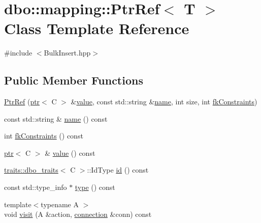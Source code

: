 \hypertarget{classdbo_1_1mapping_1_1_ptr_ref}{\section{dbo\+:\+:mapping\+:\+:Ptr\+Ref$<$ T $>$ Class Template Reference}
\label{classdbo_1_1mapping_1_1_ptr_ref}
}


{\ttfamily \#include $<$Bulk\+Insert.\+hpp$>$}

\subsection*{Public Member Functions}
\begin{DoxyCompactItemize}
\item 
\hyperlink{classdbo_1_1mapping_1_1_ptr_ref_a4db1b98f81576daa11f9f1bea49b35bb}{Ptr\+Ref} (\hyperlink{classdbo_1_1ptr}{ptr}$<$ C $>$ \&\hyperlink{classdbo_1_1mapping_1_1_ptr_ref_aa8e1c4fddbf00c5500980afb1f55ade8}{value}, const std\+::string \&\hyperlink{classdbo_1_1mapping_1_1_ptr_ref_a69221246e46fc6a9acb768fe4481cdf3}{name}, int size, int \hyperlink{classdbo_1_1mapping_1_1_ptr_ref_acff9c1f76ec5eca8c092d021bf59b0b0}{fk\+Constraints})
\item 
const std\+::string \& \hyperlink{classdbo_1_1mapping_1_1_ptr_ref_a69221246e46fc6a9acb768fe4481cdf3}{name} () const 
\item 
int \hyperlink{classdbo_1_1mapping_1_1_ptr_ref_acff9c1f76ec5eca8c092d021bf59b0b0}{fk\+Constraints} () const 
\item 
\hyperlink{classdbo_1_1ptr}{ptr}$<$ C $>$ \& \hyperlink{classdbo_1_1mapping_1_1_ptr_ref_aa8e1c4fddbf00c5500980afb1f55ade8}{value} () const 
\item 
\hyperlink{structdbo_1_1traits_1_1dbo__traits}{traits\+::dbo\+\_\+traits}$<$ C $>$\+::Id\+Type \hyperlink{classdbo_1_1mapping_1_1_ptr_ref_af8368c09d2719cda38a089e9ae5f77d8}{id} () const 
\item 
const std\+::type\+\_\+info $\ast$ \hyperlink{classdbo_1_1mapping_1_1_ptr_ref_aaa6611897ff8d1442bf40a523ce027f3}{type} () const 
\item 
{\footnotesize template$<$typename A $>$ }\\void \hyperlink{classdbo_1_1mapping_1_1_ptr_ref_a2b5e67016cd1206bf13f592495992b5b}{visit} (A \&action, \hyperlink{classdbo_1_1connection}{connection} \&conn) const 
\end{DoxyCompactItemize}


